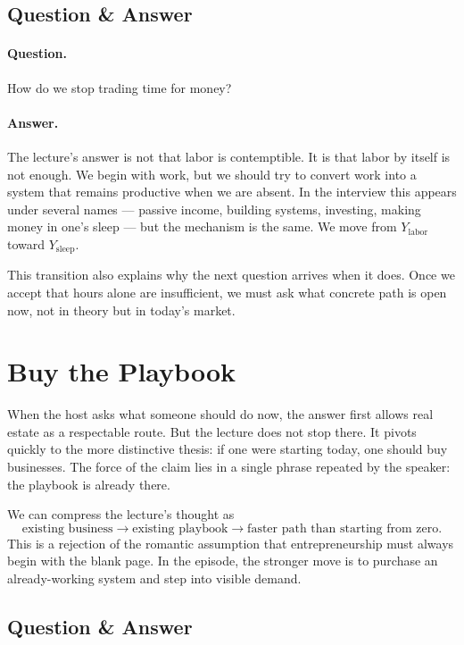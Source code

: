 \subsection{Question \& Answer}

\paragraph{Question.} How do we stop trading time for money?

\paragraph{Answer.} The lecture's answer is not that labor is contemptible. It is that labor by itself is not enough. We begin with work, but we should try to convert work into a system that remains productive when we are absent. In the interview this appears under several names --- passive income, building systems, investing, making money in one's sleep --- but the mechanism is the same. We move from \(Y_{\text{labor}}\) toward \(Y_{\text{sleep}}\).

This transition also explains why the next question arrives when it does. Once we accept that hours alone are insufficient, we must ask what concrete path is open now, not in theory but in today's market.

\section{Buy the Playbook}

When the host asks what someone should do now, the answer first allows real estate as a respectable route. But the lecture does not stop there. It pivots quickly to the more distinctive thesis: if one were starting today, one should buy businesses. The force of the claim lies in a single phrase repeated by the speaker: the playbook is already there.

We can compress the lecture's thought as
\begin{equation}
\text{existing business} \to \text{existing playbook} \to \text{faster path than starting from zero}.
\end{equation}
This is a rejection of the romantic assumption that entrepreneurship must always begin with the blank page. In the episode, the stronger move is to purchase an already-working system and step into visible demand.

\subsection{Question \& Answer}


